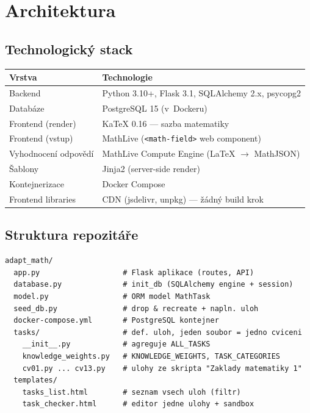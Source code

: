 \documentclass[11pt,a4paper]{article}
\begin{document}
\section{Architektura}

\subsection{Technologický stack}

\begin{tabular}{ll}
  \toprule
  \textbf{Vrstva}         & \textbf{Technologie} \\
  \midrule
  Backend                 & Python 3.10+, Flask 3.1, SQLAlchemy 2.x, psycopg2 \\
  Databáze                & PostgreSQL 15 (v~Dockeru) \\
  Frontend (render)       & KaTeX 0.16 --- sazba matematiky \\
  Frontend (vstup)        & MathLive (\texttt{<math-field>} web component) \\
  Vyhodnocení odpovědí    & MathLive Compute Engine (LaTeX $\to$ MathJSON) \\
  Šablony                 & Jinja2 (server-side render) \\
  Kontejnerizace          & Docker Compose \\
  Frontend libraries      & CDN (jsdelivr, unpkg) --- žádný build krok \\
  \bottomrule
\end{tabular}

\subsection{Struktura repozitáře}

\begin{lstlisting}[style=shell]
adapt_math/
  app.py                   # Flask aplikace (routes, API)
  database.py              # init_db (SQLAlchemy engine + session)
  model.py                 # ORM model MathTask
  seed_db.py               # drop & recreate + napln. uloh
  docker-compose.yml       # PostgreSQL kontejner
  tasks/                   # def. uloh, jeden soubor = jedno cviceni
    __init__.py            # agreguje ALL_TASKS
    knowledge_weights.py   # KNOWLEDGE_WEIGHTS, TASK_CATEGORIES
    cv01.py ... cv13.py    # ulohy ze skripta "Zaklady matematiky 1"
  templates/
    tasks_list.html        # seznam vsech uloh (filtr)
    task_checker.html      # editor jedne ulohy + sandbox
\end{lstlisting}
\end{document}
